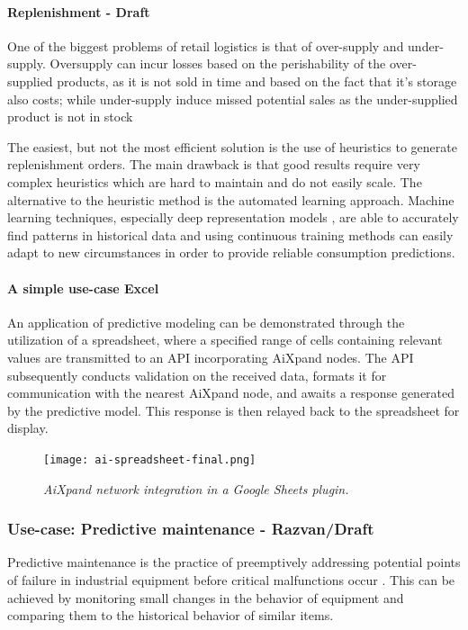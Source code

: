 \documentclass{article}
\begin{document}
\paragraph{Replenishment - Draft} One of the biggest problems of retail logistics is that of over-supply and under-supply. Oversupply can incur losses based on the perishability of the over-supplied products, as it is not sold in time and based on the fact that it's storage also costs; while under-supply induce missed potential sales as the under-supplied product is not in stock

The easiest, but not the most efficient solution is the use of heuristics \cite{stefanovic2015collaborative} to generate replenishment orders. The main drawback is that good results require very complex heuristics which are hard to maintain and do not easily scale. The alternative to the heuristic method is the automated learning approach. Machine learning techniques, especially deep representation models \cite{kilimci2019improved}, are able to accurately find patterns in historical data and using continuous training methods can easily adapt to new circumstances in order to provide reliable consumption predictions.

\paragraph{A simple use-case Excel} 
An application of predictive modeling can be demonstrated through the utilization of a spreadsheet, where a specified range of cells containing relevant values are transmitted to an API incorporating AiXpand nodes. The API subsequently conducts validation on the received data, formats it for communication with the nearest AiXpand node, and awaits a response generated by the predictive model. This response is then relayed back to the spreadsheet for display.

\begin{figure}
    \centering
    \texttt{[image: ai-spreadsheet-final.png]}
    \caption{\textit{AiXpand network integration in a Google Sheets plugin.}}
    \label{fig:ai-spreadsheet}
\end{figure}

\subsubsection{Use-case: Predictive maintenance - Razvan/Draft}
Predictive maintenance is the practice of preemptively addressing potential points of failure in industrial equipment before critical malfunctions occur \cite{mobley2002introduction}. This can be achieved by monitoring small changes in the behavior of equipment and comparing them to the historical behavior of similar items.
\end{document}
